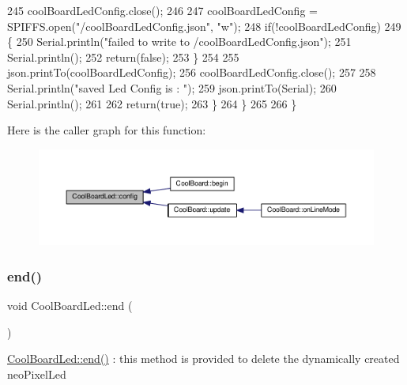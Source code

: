 \begin{DoxyCode}
245             coolBoardLedConfig.close();
246             
247             coolBoardLedConfig = SPIFFS.open(\textcolor{stringliteral}{"/coolBoardLedConfig.json"}, \textcolor{stringliteral}{"w"});
248             \textcolor{keywordflow}{if}(!coolBoardLedConfig)
249             \{
250                 Serial.println(\textcolor{stringliteral}{"failed to write to /coolBoardLedConfig.json"});
251                 Serial.println();
252                 \textcolor{keywordflow}{return}(\textcolor{keyword}{false});          
253             \}
254 
255             json.printTo(coolBoardLedConfig);
256             coolBoardLedConfig.close();
257 
258             Serial.println(\textcolor{stringliteral}{"saved Led Config is : "});
259             json.printTo(Serial);
260             Serial.println();
261 
262             \textcolor{keywordflow}{return}(\textcolor{keyword}{true}); 
263         \}
264     \}   
265 
266 \}               
\end{DoxyCode}
Here is the caller graph for this function\+:\nopagebreak
\begin{figure}[H]
\begin{center}
\leavevmode
\includegraphics[width=350pt]{classCoolBoardLed_a1b60e5e30bea96c49ed62ed1bf1ffc8b_icgraph}
\end{center}
\end{figure}
\mbox{\label{classCoolBoardLed_a69f323359e0c9f797422f2152b5d41ef}} 
\subsubsection{\texorpdfstring{end()}{end()}}
{\footnotesize\ttfamily void Cool\+Board\+Led\+::end (\begin{DoxyParamCaption}{ }\end{DoxyParamCaption})}

\hyperlink{classCoolBoardLed_a69f323359e0c9f797422f2152b5d41ef}{Cool\+Board\+Led\+::end()} \+: this method is provided to delete the dynamically created neo\+Pixel\+Led 

